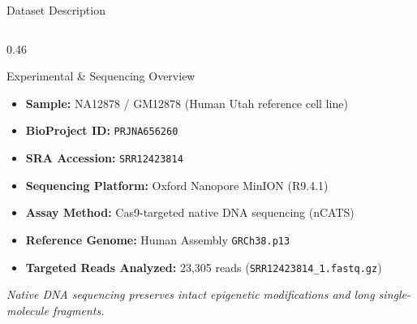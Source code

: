 \documentclass[aspectratio=169, 10pt]{beamer}
\begin{document}
\begin{frame}{Dataset Description}
    \begin{columns}[T]
        \begin{column}{0.46\textwidth}
            \begin{block}{Experimental \& Sequencing Overview}
                \begin{itemize}\footnotesize
                    \item \textbf{Sample:} NA12878 / GM12878 (Human Utah reference cell line)
                    \item \textbf{BioProject ID:} \texttt{PRJNA656260}
                    \item \textbf{SRA Accession:} \texttt{SRR12423814}
                    \item \textbf{Sequencing Platform:} Oxford Nanopore MinION (R9.4.1)
                    \item \textbf{Assay Method:} Cas9-targeted native DNA sequencing (nCATS)
                    \item \textbf{Reference Genome:} Human Assembly \texttt{GRCh38.p13}
                    \item \textbf{Targeted Reads Analyzed:} 23,305 reads (\texttt{SRR12423814\_1.fastq.gz})
                \end{itemize}
            \end{block}
            \vspace{-0.1cm}
            \begin{center}
                \scriptsize \textit{Native DNA sequencing preserves intact epigenetic modifications and long single-molecule fragments.}
            \end{center}
        \end{column}


\end{columns}
\end{frame}
\end{document}
